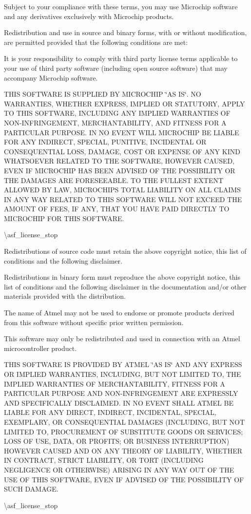 Subject to your compliance with these terms, you may use Microchip software and any derivatives exclusively with Microchip products.

Redistribution and use in source and binary forms, with or without modification, are permitted provided that the following conditions are met\+:

It is your responsibility to comply with third party license terms applicable to your use of third party software (including open source software) that may accompany Microchip software.

THIS SOFTWARE IS SUPPLIED BY MICROCHIP \char`\"{}\+AS IS\char`\"{}. NO WARRANTIES, WHETHER EXPRESS, IMPLIED OR STATUTORY, APPLY TO THIS SOFTWARE, INCLUDING ANY IMPLIED WARRANTIES OF NON-\/\+INFRINGEMENT, MERCHANTABILITY, AND FITNESS FOR A PARTICULAR PURPOSE. IN NO EVENT WILL MICROCHIP BE LIABLE FOR ANY INDIRECT, SPECIAL, PUNITIVE, INCIDENTAL OR CONSEQUENTIAL LOSS, DAMAGE, COST OR EXPENSE OF ANY KIND WHATSOEVER RELATED TO THE SOFTWARE, HOWEVER CAUSED, EVEN IF MICROCHIP HAS BEEN ADVISED OF THE POSSIBILITY OR THE DAMAGES ARE FORESEEABLE. TO THE FULLEST EXTENT ALLOWED BY LAW, MICROCHIP\textquotesingle{}S TOTAL LIABILITY ON ALL CLAIMS IN ANY WAY RELATED TO THIS SOFTWARE WILL NOT EXCEED THE AMOUNT OF FEES, IF ANY, THAT YOU HAVE PAID DIRECTLY TO MICROCHIP FOR THIS SOFTWARE.

\textbackslash{}asf\+\_\+license\+\_\+stop


\begin{DoxyEnumerate}
\item Redistributions of source code must retain the above copyright notice, this list of conditions and the following disclaimer.
\item Redistributions in binary form must reproduce the above copyright notice, this list of conditions and the following disclaimer in the documentation and/or other materials provided with the distribution.
\item The name of Atmel may not be used to endorse or promote products derived from this software without specific prior written permission.
\item This software may only be redistributed and used in connection with an Atmel microcontroller product.
\end{DoxyEnumerate}

THIS SOFTWARE IS PROVIDED BY ATMEL \char`\"{}\+AS IS\char`\"{} AND ANY EXPRESS OR IMPLIED WARRANTIES, INCLUDING, BUT NOT LIMITED TO, THE IMPLIED WARRANTIES OF MERCHANTABILITY, FITNESS FOR A PARTICULAR PURPOSE AND NON-\/\+INFRINGEMENT ARE EXPRESSLY AND SPECIFICALLY DISCLAIMED. IN NO EVENT SHALL ATMEL BE LIABLE FOR ANY DIRECT, INDIRECT, INCIDENTAL, SPECIAL, EXEMPLARY, OR CONSEQUENTIAL DAMAGES (INCLUDING, BUT NOT LIMITED TO, PROCUREMENT OF SUBSTITUTE GOODS OR SERVICES; LOSS OF USE, DATA, OR PROFITS; OR BUSINESS INTERRUPTION) HOWEVER CAUSED AND ON ANY THEORY OF LIABILITY, WHETHER IN CONTRACT, STRICT LIABILITY, OR TORT (INCLUDING NEGLIGENCE OR OTHERWISE) ARISING IN ANY WAY OUT OF THE USE OF THIS SOFTWARE, EVEN IF ADVISED OF THE POSSIBILITY OF SUCH DAMAGE.

\textbackslash{}asf\+\_\+license\+\_\+stop 